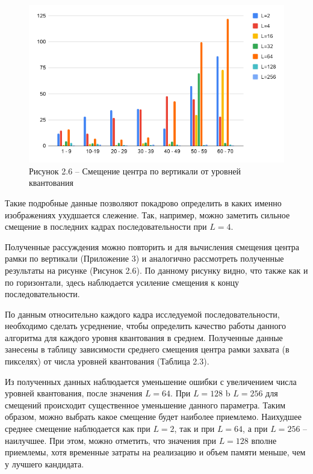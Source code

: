 \begin{figure}[h!]
    \centering
    \includegraphics[width = 13 cm]{tests/img/diag_y.png}
    \caption*{Рисунок 2.6 -- Смещение центра по вертикали от уровней квантования}
    \label{fig:my_label}
\end{figure}

Такие подробные данные позволяют покадрово определить в каких именно изображениях ухудшается слежение. Так, например, можно заметить сильное смещение в последних кадрах последовательности при $L=4$.

Полученные рассуждения можно повторить и для вычисления смещения центра рамки по вертикали (Приложение 3) и аналогично рассмотреть полученные результаты на рисунке (Рисунок 2.6). По данному рисунку видно, что также как и по горизонтали, здесь наблюдается усиление смещения к концу последовательности. 



По данным относительно каждого кадра исследуемой последовательности, необходимо сделать усреднение, чтобы определить качество работы данного алгоритма для каждого уровня квантования в среднем. Полученные данные занесены в таблицу зависимости среднего смещения центра рамки захвата (в пикселях) от числа уровней квантования (Таблица 2.3).

Из полученных данных наблюдается уменьшение ошибки с увеличением числа уровней квантования, после значения $L=64$. При $L = 128$  b $L=256$ для смещений происходит существенное уменьшение данного параметра. Таким образом, можно выбрать какое смещение будет наиболее приемлемо. Наихудшее среднее смещение наблюдается как при $L=2$, так и при $L=64$, а при $L=256$ -- наилучшее. При этом, можно отметить, что значения при $L=128$  вполне приемлемы, хотя временные затраты на реализацию и объем памяти меньше, чем у лучшего кандидата.     

